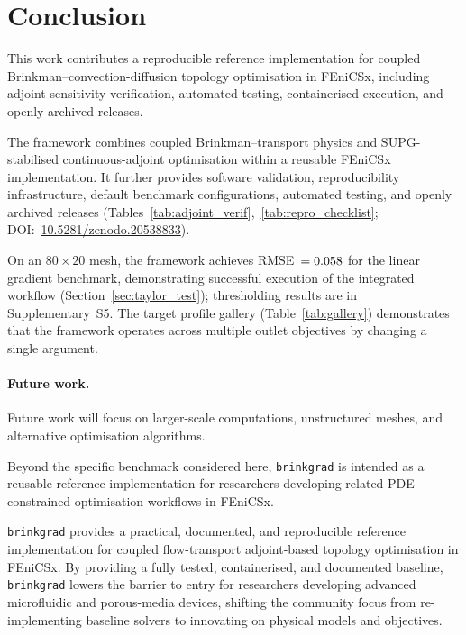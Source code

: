 \section{Conclusion}
\label{sec:conclusion}
This work contributes a reproducible reference implementation
for coupled Brinkman--convection-diffusion topology optimisation
in FEniCSx, including adjoint sensitivity verification,
automated testing, containerised execution,
and openly archived releases.

The framework combines coupled Brinkman--transport physics
and SUPG-stabilised continuous-adjoint optimisation
within a reusable FEniCSx implementation.
It further provides software validation, reproducibility infrastructure,
default benchmark configurations, automated testing,
and openly archived releases
(Tables~\ref{tab:adjoint_verif},~\ref{tab:repro_checklist};
DOI:~\href{https://doi.org/10.5281/zenodo.20538833}{10.5281/zenodo.20538833}).

On an $80\times20$ mesh, the framework achieves
RMSE~$=0.058$ for the linear gradient benchmark,
demonstrating successful execution of the integrated workflow
(Section~\ref{sec:taylor_test});
thresholding results are in Supplementary~S5.
The target profile gallery (Table~\ref{tab:gallery}) demonstrates
that the framework operates across multiple outlet objectives
by changing a single argument.

\paragraph{Future work.}
Future work will focus on larger-scale computations,
unstructured meshes, and alternative optimisation algorithms.

Beyond the specific benchmark considered here,
\texttt{brinkgrad} is intended as a reusable reference implementation
for researchers developing related PDE-constrained optimisation
workflows in FEniCSx.

\texttt{brinkgrad} provides a practical, documented, and
reproducible reference implementation for coupled flow-transport
adjoint-based topology optimisation in FEniCSx.
By providing a fully tested, containerised, and documented baseline,
\texttt{brinkgrad} lowers the barrier to entry for researchers
developing advanced microfluidic and porous-media devices,
shifting the community focus from re-implementing baseline solvers
to innovating on physical models and objectives.
